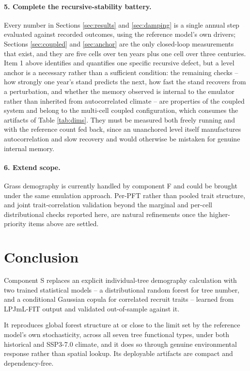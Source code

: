 \documentclass[11pt]{article}
\begin{document}
\paragraph{5. Complete the recursive-stability battery.}
Every number in Sections \ref{sec:results} and \ref{sec:damping} is a single annual step evaluated against recorded outcomes, using the reference model's own drivers; Sections \ref{sec:coupled} and \ref{sec:anchor} are the only closed-loop measurements that exist, and they are five cells over ten years plus one cell over three centuries. Item 1 above identifies and quantifies one specific recursive defect, but a level anchor is a necessary rather than a sufficient condition: the remaining checks -- how strongly one year's stand predicts the next, how fast the stand recovers from a perturbation, and whether the memory observed is internal to the emulator rather than inherited from autocorrelated climate -- are properties of the coupled system and belong to the multi-cell coupled configuration, which consumes the artifacts of Table \ref{tab:dims}. They must be measured both freely running and with the reference count fed back, since an unanchored level itself manufactures autocorrelation and slow recovery and would otherwise be mistaken for genuine internal memory.

\paragraph{6. Extend scope.}
Grass demography is currently handled by component F and could be brought under the same emulation approach. Per-PFT rather than pooled trait structure, and joint trait-correlation validation beyond the marginal and per-cell distributional checks reported here, are natural refinements once the higher-priority items above are settled.

\section{Conclusion}

Component S replaces an explicit individual-tree demography calculation with two trained statistical models -- a distributional random forest for tree number, and a conditional Gaussian copula for correlated recruit traits -- learned from LPJmL-FIT output and validated out-of-sample against it.

It reproduces global forest structure at or close to the limit set by the reference model's own stochasticity, across all seven tree functional types, under both historical and SSP3-7.0 climate, and it does so through genuine environmental response rather than spatial lookup. Its deployable artifacts are compact and dependency-free.
\end{document}
